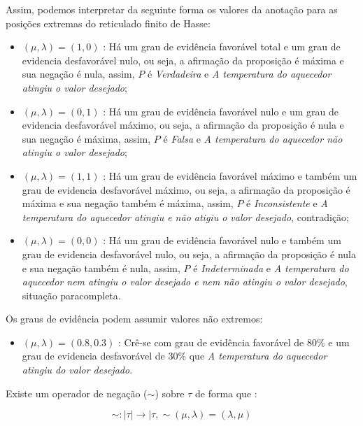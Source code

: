Assim, podemos interpretar da seguinte forma os valores da anotação para as posições extremas do reticulado finito de Hasse:

\begin{itemize}
\item 
$(\mu, \lambda ) = (1,0)$ : Há um grau de evidência favorável total e um grau de evidencia desfavorável nulo, ou seja, a afirmação da proposição é máxima e sua negação é nula, assim,  $P$ é \emph{Verdadeira} e \emph{A temperatura do aquecedor atingiu o valor desejado};

\item 
$(\mu, \lambda ) = (0,1)$ : Há um grau de evidência favorável nulo e um grau de evidencia desfavorável máximo, ou seja, a afirmação da proposição é nula e sua negação é máxima, assim,  $P$ é \emph{Falsa} e \emph{A temperatura do aquecedor não atingiu o valor desejado};

\item 
$(\mu, \lambda ) = (1,1)$ : Há um grau de evidência favorável máximo e também um grau de evidencia desfavorável máximo, ou seja, a afirmação da proposição é máxima e sua negação também é máxima, assim,  $P$ é \emph{Inconsistente} e \emph{A temperatura do aquecedor atingiu e não atigiu o valor desejado}, contradição;

\item 
$(\mu, \lambda ) = (0,0)$ : Há um grau de evidência favorável nulo e também um grau de evidencia desfavorável nulo, ou seja, a afirmação da proposição é nula e sua negação também é nula, assim,  $P$ é \emph{Indeterminada} e \emph{A temperatura do aquecedor nem atingiu o valor desejado e nem não atingiu o valor desejado}, situação paracompleta.

\end{itemize}

Os graus de evidência podem assumir valores não extremos:

\begin{itemize}
\item 
$(\mu, \lambda ) = (0.8,0.3)$ : Crê-se com grau de evidência favorável de 80\% e um grau de evidencia desfavorável de 30\%  que \emph{A temperatura do aquecedor atingiu do valor desejado}.
\end{itemize}

Existe um operador de negação ($\sim $) sobre $\tau$ de forma que :
\begin{center}
\begin{equation}
\sim  : \mid \tau \mid \rightarrow \mid \tau , \sim(\mu, \lambda ) = (\lambda, \mu )
\end{equation}
\end{center}

